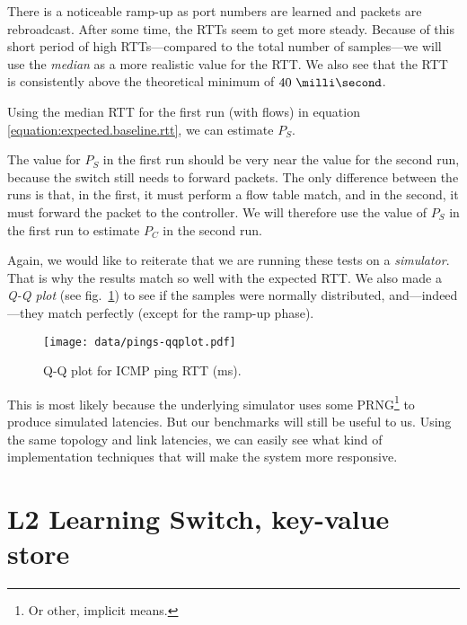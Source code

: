 

There is a noticeable ramp-up as port numbers are learned and packets are
rebroadcast.  After some time, the \acs{RTT}s seem to get more steady.
Because of this short period of high \acs{RTT}s---compared to the total number of
samples---we will use the \textit{median} as a more realistic value for the
RTT. We also see that the RTT is consistently above the theoretical minimum
of $\ms{40}$.

Using the median RTT for the first run (with flows)
in equation \ref{equation:expected.baseline.rtt}, we can estimate $P_S$.



The value for $P_S$ in the first run should be very near the value for the
second run, because the switch still needs to forward packets.  The only
difference between the runs is that, in the first, it must perform a flow
table match, and in the second, it must forward the packet to the
controller.  We will therefore use the value of $P_S$ in the first run to
estimate $P_C$ in the second run.



Again, we would like to reiterate that we are running these tests on a
\textit{simulator}.  That is why the results match so well with the expected
\acs{RTT}.  We also made a \textit{Q-Q plot} (see
fig.~\ref{figure:pings.qqplot}) to see if the samples were normally
distributed, and---indeed---they match perfectly (except for the ramp-up
phase).

\begin{figure}
  \centering
  \texttt{[image: data/pings-qqplot.pdf]}
  \caption{Q-Q plot for ICMP ping RTT (ms).}
  \label{figure:pings.qqplot}
\end{figure}

This is most likely because the underlying simulator uses some
\acf{PRNG}\footnote{Or other, implicit means.} to produce simulated latencies.  But our
benchmarks will still be useful to us.  Using the same topology and link
latencies, we can easily see what kind of implementation techniques that
will make the system more responsive.

\section{L2 Learning Switch, key-value store}
\label{chapter:benchmark.l2.kv.noflows}

